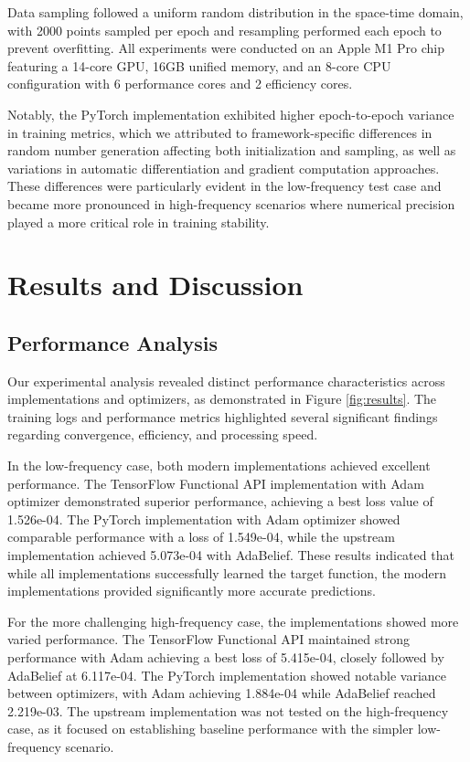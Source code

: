 \documentclass[10pt,journal,compsoc,onecolumn]{IEEEtran}
\begin{document}
Data sampling followed a uniform random distribution in the space-time domain, with 2000 points sampled per epoch and resampling performed each epoch to prevent overfitting. All experiments were conducted on an Apple M1 Pro chip featuring a 14-core GPU, 16GB unified memory, and an 8-core CPU configuration with 6 performance cores and 2 efficiency cores.

Notably, the PyTorch implementation exhibited higher epoch-to-epoch variance in training metrics, which we attributed to framework-specific differences in random number generation affecting both initialization and sampling, as well as variations in automatic differentiation and gradient computation approaches. These differences were particularly evident in the low-frequency test case and became more pronounced in high-frequency scenarios where numerical precision played a more critical role in training stability.

\section{Results and Discussion}\label{sec:discussion}
\subsection{Performance Analysis}
Our experimental analysis revealed distinct performance characteristics across implementations and optimizers, as demonstrated in Figure \ref{fig:results}. The training logs and performance metrics highlighted several significant findings regarding convergence, efficiency, and processing speed.

In the low-frequency case, both modern implementations achieved excellent performance. The TensorFlow Functional API implementation with Adam optimizer demonstrated superior performance, achieving a best loss value of 1.526e-04. The PyTorch implementation with Adam optimizer showed comparable performance with a loss of 1.549e-04, while the upstream implementation achieved 5.073e-04 with AdaBelief. These results indicated that while all implementations successfully learned the target function, the modern implementations provided significantly more accurate predictions.

For the more challenging high-frequency case, the implementations showed more varied performance. The TensorFlow Functional API maintained strong performance with Adam achieving a best loss of 5.415e-04, closely followed by AdaBelief at 6.117e-04. The PyTorch implementation showed notable variance between optimizers, with Adam achieving 1.884e-04 while AdaBelief reached 2.219e-03. The upstream implementation was not tested on the high-frequency case, as it focused on establishing baseline performance with the simpler low-frequency scenario.
\end{document}
